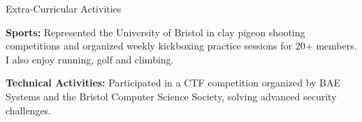 \documentclass{resume} %
\begin{document}

\begin{rSection}{Extra-Curricular Activities} 
\vspace{-1.25em}

\item \textbf{Sports:}
Represented the University of Bristol in clay pigeon shooting competitions and organized weekly kickboxing practice sessions for 20+ members. I also enjoy running, golf and climbing. \\

\vspace{-1.25em}

\item \textbf{Technical Activities:}
Participated in a CTF competition organized by BAE Systems and the Bristol Computer Science Society, solving advanced security challenges.

\end{rSection}
\end{document}
